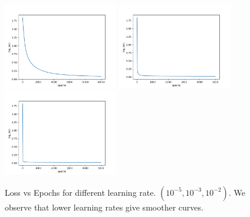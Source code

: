 \documentclass[a4paper,10pt,twocolumn]{article}
\begin{document}
\begin{figure}[h!]
\centering
\includegraphics[scale=1.0, width=5cm]{Fig11.png}
\includegraphics[scale=1.0, width=5cm]{Fig12.png}
\includegraphics[scale=1.0, width=5cm]{Fig13.png}
\caption*{Loss vs Epochs for different learning rate. $(10^{-5}, 10^{-3}, 10^{-2})$. We observe that lower learning rates give smoother curves.}
\end{figure}
\end{document}

